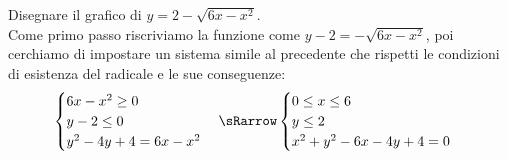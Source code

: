 \begin{esempio}
\begin{minipage}{.3\textwidth}
  \end{minipage}

\end{esempio}

\begin{esempio} Disegnare il grafico di \(y=2-\sqrt{6x-x^{2}} \).\\[7pt]Come primo passo riscriviamo la 
funzione come \(y-2=-\sqrt{6x-x^{2}}  \), poi cerchiamo di impostare un 
sistema simile al precedente che rispetti le condizioni di esistenza del 
radicale e le sue conseguenze:
\[\begin{cases}  6x-x^{2}\geq0   \\ y-2\leq0  \\y^{2}-4y+4=6x-x^{2} 
\end{cases} \sRarrow
\begin{cases}   0\leq x\leq6   \\ y\leq2  \\ x^{2}+y^{2}-6x-4y+4=0 
\end{cases}\]


\end{esempio}
